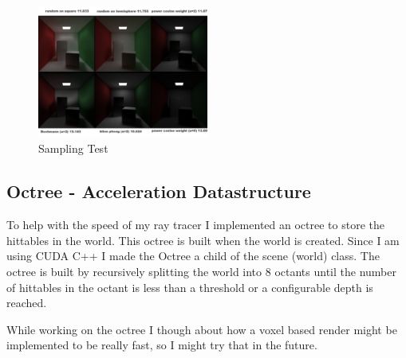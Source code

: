 \documentclass{article}
\begin{document}
        \begin{figure}[h!]
            \centering
            \includegraphics[width=0.5\textwidth]{samples/Lighting_Comparison.png}
            \caption{Sampling Test}
        \end{figure}


    \subsection{Octree - Acceleration Datastructure} 
    To help with the speed of my ray tracer I implemented an octree to store the hittables in the world. This octree is built when the world is created. Since I am using CUDA C++ I made the Octree a child of the scene (world) class. The octree is built by recursively splitting the world into 8 octants until the number of hittables in the octant is less than a threshold or a configurable depth is reached. \par 
    While working on the octree I though about how a voxel based render might be implemented to be really fast, so I might try that in the future. \par   
\end{document}
